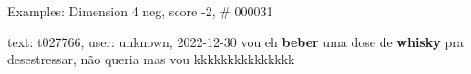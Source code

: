 \begin{frame}{Examples: Dimension 4 neg, score -2, \# 000031}
\footnotesize
\begin{alertblock}{text: t027766, user: unknown, 2022-12-30}
vou eh \textbf{beber} uma dose de \textbf{whisky} pra desestressar, não queria 
mas vou kkkkkkkkkkkkkkk 
\end{alertblock}
\end{frame}
